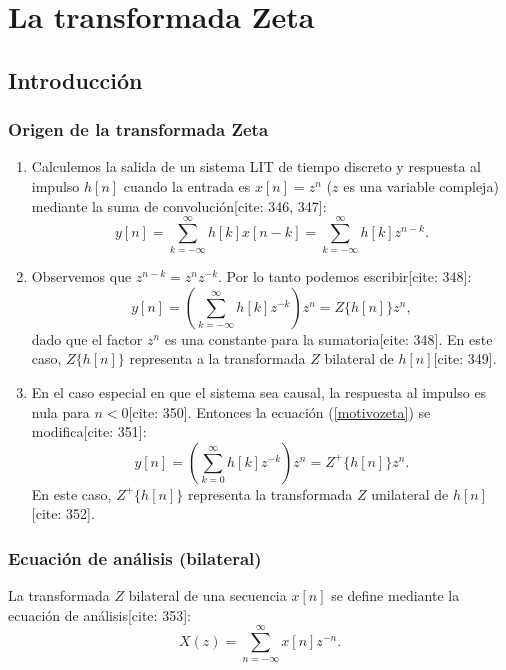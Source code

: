\chapter{La transformada Zeta}

\section{Introducci\'{o}n}

\subsection{Origen de la transformada Zeta}

\begin{enumerate}
	
	\item Calculemos la salida de un sistema LIT de tiempo discreto y respuesta al impulso $h[n]$ cuando la entrada es $x[n] = z^{n}$ ($z$ es una variable compleja) mediante la suma de convoluci\'{o}n[cite: 346, 347]:
	\begin{equation}
		y[n] = \sum_{k=-\infty}^{\infty} h[k] x[n-k] = \sum_{k=-\infty}^{\infty} h[k] z^{n-k}.
	\end{equation}
	
	\item Observemos que $z^{n-k} = z^{n} z^{-k}$. Por lo tanto podemos escribir[cite: 348]:
	\begin{equation}
		y[n] = \left(\sum_{k=-\infty}^{\infty} h[k] z^{-k} \right) z^{n} = Z\{h[n]\} z^{n}, \label{motivozeta}
	\end{equation}
	dado que el factor $z^{n}$ es una constante para la sumatoria[cite: 348]. En este caso, $Z\{h[n]\}$ representa a la transformada $Z$ bilateral de $h[n]$[cite: 349].
	
	\item En el caso especial en que el sistema sea causal, la respuesta al impulso es nula para $n<0$[cite: 350]. Entonces la ecuaci\'{o}n (\ref{motivozeta}) se modifica[cite: 351]:
	\begin{equation}
		y[n] = \left(\sum_{k=0}^{\infty} h[k] z^{-k} \right) z^{n} = Z^{+}\{h[n]\} z^{n}.
	\end{equation}
	En este caso, $Z^{+}\{h[n]\}$ representa la transformada $Z$ unilateral de $h[n]$[cite: 352].
\end{enumerate}

\subsection{Ecuaci\'{o}n de an\'{a}lisis (bilateral)}
La transformada $Z$ bilateral de una secuencia $x[n]$ se define mediante la ecuaci\'{o}n de an\'{a}lisis[cite: 353]:
\begin{equation}
	X(z) = \sum_{n=-\infty}^{\infty} x[n] z^{-n}.
\end{equation}

